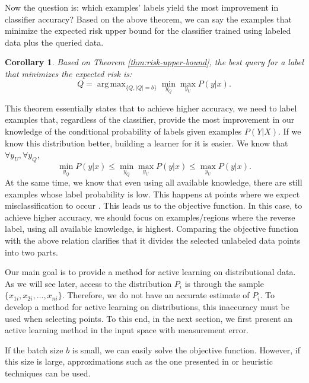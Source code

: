 \documentclass[12pt]{article}
\newtheorem{corollary}{Corollary}[section]
\DeclareMathOperator*{\argmax}{arg\,max}
\begin{document}
	Now the question is: which examples' labels yield the most improvement in classifier accuracy? Based on the above theorem, we can say the examples that minimize the expected risk upper bound for the classifier trained using labeled data plus the queried data.
	
	\begin{corollary}
		Based on Theorem \ref{thm:risk-upper-bound}, the best query for a label that minimizes the expected risk is:
		\begin{equation}
			Q = \argmax_{\{Q, |Q|=b\}} \min_{y_Q} \max_{y_U} P(y|x).
		\end{equation}
	\end{corollary}
	This theorem essentially states that to achieve higher accuracy, we need to label examples that, regardless of the classifier, provide the most improvement in our knowledge of the conditional probability of labels given examples $P(Y|X)$. If we know this distribution better, building a learner for it is easier. We know that $\forall y_U, \forall y_Q$,
	\begin{equation}
		\min_{y_Q} P(y|x) \le \min_{y_Q} \max_{y_U} P(y|x) \le \max_{y_U} P(y|x).
	\end{equation}
	At the same time, we know that even using all available knowledge, there are still examples whose label probability is low. This happens at points where we expect misclassification to occur \cite{mackay1992information}. This leads us to the objective function. In this case, to achieve higher accuracy, we should focus on examples/regions where the reverse label, using all available knowledge, is highest. Comparing the objective function with the above relation clarifies that it divides the selected unlabeled data points into two parts.
	
	Our main goal is to provide a method for active learning on distributional data. As we will see later, access to the distribution $P_i$ is through the sample $\{x_{1i}, x_{2i}, \ldots, x_{ni}\}$. Therefore, we do not have an accurate estimate of $P_i$. To develop a method for active learning on distributions, this inaccuracy must be used when selecting points. To this end, in the next section, we first present an active learning method in the input space with measurement error.
	
	If the batch size $b$ is small, we can easily solve the objective function. However, if this size is large, approximations such as the one presented in \cite{karimi2016statistical} or heuristic techniques can be used.
	
\end{document}
